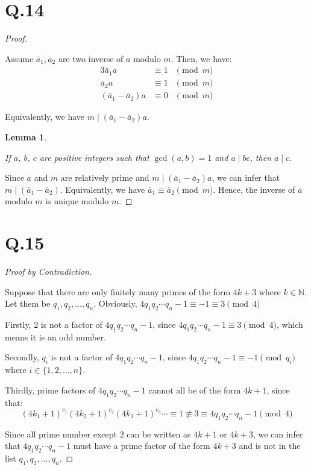 \documentclass[a4paper,12pt]{article}
\newtheorem{lemma}{Lemma}
\begin{document}
\section*{Q.14}

\begin{proof}
$ $

Assume $\bar{a}_1, \bar{a}_2$ are two inverse of $a$ modulo $m$.
Then, we have:
\begin{alignat*}{3}
	\bar{a}_1 a &\equiv 1 &\pmod{m} \\
	\bar{a}_2 a &\equiv 1 &\pmod{m} \\
	(\bar{a}_1 - \bar{a}_2) a &\equiv 0 &\pmod{m}
\end{alignat*}


Equivalently, we have $m \mid (\bar{a}_1 - \bar{a}_2) a$.

	\begin{lemma}
	$ $

	If $a$, $b$, $c$ are positive integers such that $\gcd(a, b) = 1$ and $a \mid bc$, then $a \mid c$.
	\end{lemma}

Since $a$ and $m$ are relatively prime and $m \mid (\bar{a}_1 - \bar{a}_2) a$, we can infer that $m \mid (\bar{a}_1 - \bar{a}_2)$.
Equivalently, we have $\bar{a}_1 \equiv \bar{a}_2 \pmod{m}$.
Hence, the inverse of $a$ modulo $m$ is unique modulo $m$.
\end{proof}

\section*{Q.15}

\begin{proof}[Proof by Contradiction]
$ $

Suppose that there are only finitely many primes of the form $4k+3$ where $k \in \mathbb{N}$.
Let them be $q_1, q_2, ..., q_n$.
Obviously, $4q_1q_2 \cdots q_n - 1 \equiv -1 \equiv 3 \pmod{4}$

Firstly, $2$ is not a factor of $4q_1q_2 \cdots q_n - 1$, since $4q_1q_2 \cdots q_n - 1 \equiv 3 \pmod{4}$, which means it is an odd number.

Secondly, $q_i$ is not a factor of $4q_1q_2 \cdots q_n - 1$, since $4q_1q_2 \cdots q_n - 1 \equiv -1 \pmod{q_i}$ where $i \in \{1,2,...,n\}$.

Thirdly, prime factors of $4q_1q_2 \cdots q_n - 1$ cannot all be of the form $4k+1$, since that:
\begin{equation*}
	(4k_1 + 1)^{c_1} (4k_2 + 1)^{c_2} (4k_3 + 1)^{c_3} \cdots \equiv 1 \not\equiv 3 \equiv 4q_1q_2 \cdots q_n - 1 \pmod{4}
\end{equation*}

Since all prime number except $2$ can be written as $4k+1$ or $4k+3$, we can infer that $4q_1q_2 \cdots q_n - 1$ must have a prime factor of the form $4k+3$ and is not in the list $q_1, q_2, ..., q_n$.
\end{proof}
\end{document}

